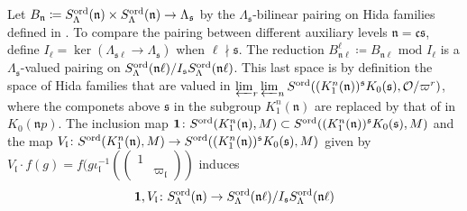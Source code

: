 \documentclass[leqno]{amsart}
\theoremstyle{definition}
\theoremstyle{remark}
\newcommand{\smat}[1]{\left(\begin{smallmatrix} #1 \end{smallmatrix}\right)}
\newcommand{\id}{\mathbf{1}}
\newcommand{\oo}{\mathcal{O}}
\newcommand{\fc}{\mathfrak{c}}
\newcommand{\fs}{\mathfrak{s}}
\newcommand{\fn}{\mathfrak{n}}
\newcommand{\fl}{\mathfrak{l}}
\newcommand{\ord}{\textnormal{ord}} %
\begin{document}
Let $B_\fn\coloneqq S_\Lambda^{\ord}(\fn)\times
S_\Lambda^{\ord}(\fn)\to \Lambda_{\fs}$ 
by the $\Lambda_{\fs}$-bilinear pairing
on Hida families defined in \cite[\S 6.4.1]{lee}.
To compare the pairing between different
auxiliary levels $\fn=\fc\fs$,
define $I_{\ell}=\ker(\Lambda_{\fs\ell}\to \Lambda_{\fs})$
when $\ell\nmid \fs$.
The reduction 
$B_{\fn\ell}^{\ell}\coloneqq B_{\fn\ell}\text{ mod }I_\ell$
is a $\Lambda_{\fs}$-valued pairing on 
$S_\Lambda^{\ord}(\fn\ell)/I_\fs S_\Lambda^{\ord}(\fn\ell)$.
This last space is by definition
the space of Hida families that are valued 
in $\varprojlim_r\varprojlim_n 
S^{\ord}((K^n_1(\fn))^{\fs}K_0(\fs),\oo/\varpi^r)$,
where the componets above $\fs$ in the subgroup $K^n_1(\fn)$
are replaced by that of in $K_0(\fn p)$.
The inclusion map 
$\id\colon S^{\ord}(K^n_1(\fn),M)\subset
S^{\ord}((K^n_1(\fn))^{\fs}K_0(\fs),M)$
and the map
$V_{\fl}\colon S^{\ord}(K^n_1(\fn),M)\to
S^{\ord}((K^n_1(\fn))^{\fs}K_0(\fs),M)$
given by $V_\fl\cdot f(g)=
f(g\iota_\fl^{-1}(\smat{1&\\&\varpi_\fl})$ induces
\[
\id, V_\fl\colon S^{\ord}_{\Lambda}(\fn)\to
S_\Lambda^{\ord}(\fn\ell)/I_\fs S_\Lambda^{\ord}(\fn\ell)
\]
\end{document}
